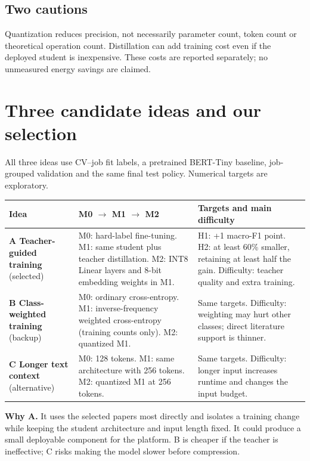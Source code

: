 \documentclass[10pt,a4paper]{article}
\begin{document}
\subsection{Two cautions}
Quantization reduces precision, not necessarily parameter count, token count or theoretical operation count. Distillation can add training cost even if the deployed student is inexpensive. These costs are reported separately; no unmeasured energy savings are claimed.

\section{Three candidate ideas and our selection}
All three ideas use CV--job fit labels, a pretrained BERT-Tiny baseline, job-grouped validation and the same final test policy. Numerical targets are exploratory.

\begin{tabularx}{\linewidth}{@{}p{2.7cm}LL@{}}\toprule
Idea & M0 $\rightarrow$ M1 $\rightarrow$ M2 & Targets and main difficulty\\\midrule
\textbf{A Teacher-guided training} (selected) & M0: hard-label fine-tuning. M1: same student plus teacher distillation. M2: INT8 Linear layers and 8-bit embedding weights in M1. & H1: +1 macro-F1 point. H2: at least 60\% smaller, retaining at least half the gain. Difficulty: teacher quality and extra training.\\
\textbf{B Class-weighted training} (backup) & M0: ordinary cross-entropy. M1: inverse-frequency weighted cross-entropy (training counts only). M2: quantized M1. & Same targets. Difficulty: weighting may hurt other classes; direct literature support is thinner.\\
\textbf{C Longer text context} (alternative) & M0: 128 tokens. M1: same architecture with 256 tokens. M2: quantized M1 at 256 tokens. & Same targets. Difficulty: longer input increases runtime and changes the input budget.\\\bottomrule
\end{tabularx}

\textbf{Why A.} It uses the selected papers most directly and isolates a training change while keeping the student architecture and input length fixed. It could produce a small deployable component for the platform. B is cheaper if the teacher is ineffective; C risks making the model slower before compression.
\end{document}
